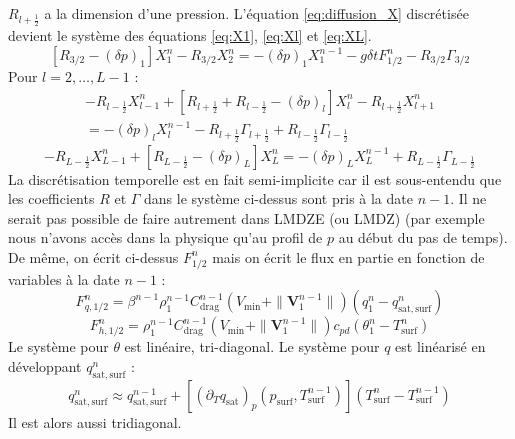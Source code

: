 \documentclass[a4paper,english,french]{article}
\begin{document}
$R_{l + \frac{1}{2}}$ a la dimension d'une pression.
L'équation \ref{eq:diffusion_X} discrétisée devient le
système des équations \ref{eq:X1}, \ref{eq:Xl} et \ref{eq:XL}.
\begin{equation}
  \label{eq:X1}
  [R_{3/2} - (\delta p)_1] X_1^n - R_{3/2} X_2^n
  = - (\delta p)_1 X_1^{n - 1} - g \delta t F_{1/2}^n - R_{3/2} \Gamma_{3/2}
\end{equation}
Pour $l = 2, \dots, L - 1$ :
\begin{multline}
  \label{eq:Xl}
  - R_{l - \frac{1}{2}} X_{l - 1}^n
  + [R_{l + \frac{1}{2}} +R_{l - \frac{1}{2}} - (\delta p)_l] X_l^n
  - R_{l + \frac{1}{2}} X_{l + 1}^n \\
  = - (\delta p)_l X_l^{n - 1}
  - R_{l + \frac{1}{2}} \Gamma_{l + \frac{1}{2}}
  + R_{l - \frac{1}{2}} \Gamma_{l - \frac{1}{2}}
\end{multline}
\begin{equation}
  \label{eq:XL}
  - R_{L - \frac{1}{2}} X_{L - 1}^n + [R_{L - \frac{1}{2}} - (\delta p)_L] X_L^n 
  = - (\delta p)_L X_L^{n - 1} + R_{L - \frac{1}{2}} \Gamma_{L - \frac{1}{2}}
\end{equation}
La discrétisation temporelle est en fait semi-implicite car il est
sous-entendu que les coefficients $R$ et $\Gamma$ dans le système
ci-dessus sont pris à la date $n - 1$. Il ne serait pas possible de
faire autrement dans LMDZE (ou LMDZ) (par exemple nous n'avons accès
dans la physique qu'au profil de $p$ au début du pas de temps). De
même, on écrit ci-dessus $F_{1/2}^n$ mais on écrit le flux en partie
en fonction de variables à la date $n - 1$ :
\begin{equation*}
  F_{q, 1/2}^n
  = \beta^{n - 1} \rho_1^{n - 1} C_\mathrm{drag}^{n - 1}
  (V_\mathrm{min} + \| \mathbf{V}_1^{n - 1} \|)
  (q_1^n - q_\mathrm{sat,surf}^n)
\end{equation*}
\begin{equation*}
  F_{h, 1/2}^n
  = \rho_1^{n - 1} C_\mathrm{drag}^{n - 1}
  (V_\mathrm{min} + \| \mathbf{V}_1^{n - 1} \|) c_{pd}
  (\theta_1^n - T_\mathrm{surf}^n)
\end{equation*}
Le système pour $\theta$ est linéaire, tri-diagonal. Le système pour
$q$ est linéarisé en développant $q_\mathrm{sat,surf}^n$ :
\begin{equation*}
  q_\mathrm{sat,surf}^n \approx q_\mathrm{sat,surf}^{n - 1} +
  [(\partial_T q_\mathrm{sat})_p (p_\mathrm{surf}, T_\mathrm{surf}^{n - 1})]
  (T_\mathrm{surf}^n - T_\mathrm{surf}^{n - 1})
\end{equation*}
Il est alors aussi tridiagonal.
\end{document}

